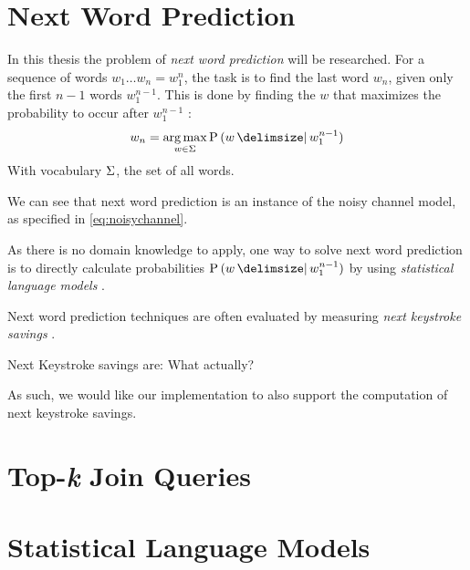 \section{Next Word Prediction}

In this thesis the problem of \emph{next word prediction} will be researched.
For a sequence of words $w_1 \ldots w_n = w_1^{n}$, the task is to find the last word
$w_n$, given only the first $n-1$ words $w_1^{n-1}$.
This is done by finding the $w$ that maximizes the probability to
occur after $w_1^{n-1}$ \parencite{Bickel2005}:
\begin{equation}
  \label{eq:nwp}
  w_n = \Argmax{w \in \Vocab} \Prob{w}{w_1^{n-1}}
\end{equation}
With vocabulary $\Sigma$, the set of all words.

We can see that next word prediction is an instance of the noisy channel model,
as specified in \cref{eq:noisychannel}.

As there is no domain knowledge to apply, one way to solve next word prediction
is to directly calculate probabilities $\Prob{w}{w_1^{n-1}}$ by using
\emph{statistical language models} \parencite{Bickel2005}.

Next word prediction techniques are often evaluated by measuring \emph{next
keystroke savings} \parencite{Bickel2005}.
\begin{draft}Next Keystroke savings are: What actually?\end{draft}
As such, we would like our implementation to also support the computation of
next keystroke savings.

\section{Top-\emph{k} Join Queries}



\section{Statistical Language Models}



